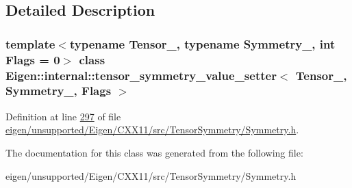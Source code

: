 \subsection{Detailed Description}
\subsubsection*{template$<$typename Tensor\+\_\+, typename Symmetry\+\_\+, int Flags = 0$>$\newline
class Eigen\+::internal\+::tensor\+\_\+symmetry\+\_\+value\+\_\+setter$<$ Tensor\+\_\+, Symmetry\+\_\+, Flags $>$}



Definition at line \hyperlink{eigen_2unsupported_2_eigen_2_c_x_x11_2src_2_tensor_symmetry_2_symmetry_8h_source_l00297}{297} of file \hyperlink{eigen_2unsupported_2_eigen_2_c_x_x11_2src_2_tensor_symmetry_2_symmetry_8h_source}{eigen/unsupported/\+Eigen/\+C\+X\+X11/src/\+Tensor\+Symmetry/\+Symmetry.\+h}.



The documentation for this class was generated from the following file\+:\begin{DoxyCompactItemize}
\item 
eigen/unsupported/\+Eigen/\+C\+X\+X11/src/\+Tensor\+Symmetry/\+Symmetry.\+h\end{DoxyCompactItemize}
